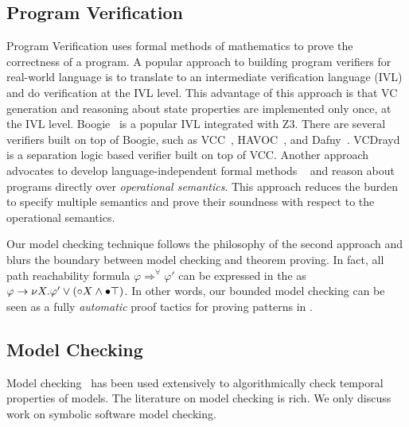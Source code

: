 \documentclass{almostllncs}
\begin{document}
\subsection{Program Verification}
Program Verification uses formal methods of mathematics to prove the correctness of a program.
A popular approach to building program verifiers for real-world language is to translate to an intermediate verification language (IVL) and do verification at the IVL level.
This advantage of this approach is that VC generation and reasoning about state properties are implemented only once, at the IVL level.
Boogie~\cite{boogie} is a popular IVL integrated with Z3.
There are several verifiers built on top of Boogie, such as VCC~\cite{DBLP:conf/tphol/CohenDHLMSST09}, HAVOC~\cite{Havoc}, and
Dafny~\cite{DBLP:conf/lpar/Leino10}.
VCDrayd~\cite{DBLP:conf/pldi/PekQM14} is a separation logic based verifier built on top of VCC.
Another approach advocates to develop language-independent formal methods ~\cite{rosu-stefanescu-2012-icalp,rosu-stefanescu-2012-fm,rosu-stefanescu-2012-oopsla,rosu-stefanescu-ciobaca-moore-2013-lics,stefanescu-ciobaca-mereuta-moore-serbanuta-rosu-2014-rta} and reason about programs directly over \emph{operational semantics}.
This approach reduces the burden to specify multiple semantics and prove their soundness with respect to the operational semantics.

Our model checking technique follows the philosophy of the second approach and blurs the boundary between model checking and theorem proving.
In fact, all path reachability formula $\varphi \Rightarrow^\forall \varphi'$ can be expressed in the \mmul as $\varphi \to \nu X \mathord{.} \varphi' \vee ({\circ} X \wedge {\bullet} \top)$.
In other words, our bounded model checking can be seen as a fully \emph{automatic} proof tactics for proving patterns in \mmul.

\subsection{Model Checking}

Model checking~\cite{Clarke:2000:MC:332656} has been used extensively to algorithmically check temporal properties of models.
The literature on model checking is rich.
We only discuss work on symbolic software model checking.
\end{document}

